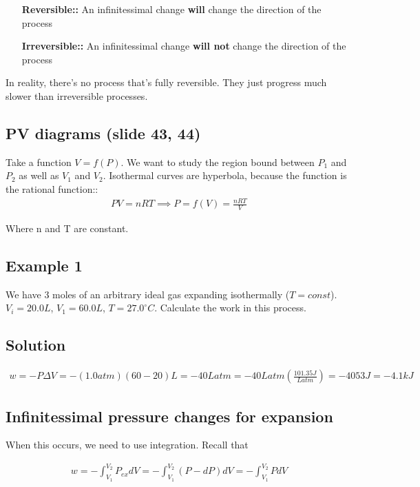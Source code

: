 \documentclass[12pt]{article}
\begin{document}
\begin{itemize}
    \item [\textbf{Reversible::}] An infinitessimal change \textbf{will} change the direction of the process
    \item [\textbf{Irreversible::}] An infinitessimal change \textbf{will not} change the direction of the process
\end{itemize}

In reality, there's no process that's fully reversible. They just progress much slower than irreversible processes.

\subsection*{PV diagrams (slide 43, 44)}
Take a function $V=f(P)$. We want to study the region bound between $P_1$ and $P_2$ as well as $V_1$ and $V_2$. Isothermal curves are hyperbola, because the function is the rational function::
\begin{align*}
    PV=nRT\implies P=f(V)=\frac{nRT}{V}
\end{align*}

Where n and T are constant.

\subsection*{Example 1}

We have 3 moles of an arbitrary ideal gas expanding isothermally ($T=const$). $V_i=20.0L$, $V_1=60.0L$, $T=27.0^{\circ}C$. Calculate the work in this process.

\subsection*{Solution}
\begin{align*}
    w=-P\Delta V=-(1.0 atm)(60-20)L=-40L atm=-40Latm(\frac{101.35J}{Latm}) =-4053J=-4.1kJ
\end{align*}

\subsection*{Infinitessimal pressure changes for expansion}
When this occurs, we need to use integration. Recall that

\begin{align*}
    w=-\int_{V_1}^{V_2}P_{ex}dV=-\int_{V_1}^{V_2}(P-dP)dV=-\int_{V_1}^{V_2}PdV
\end{align*}
\end{document}
